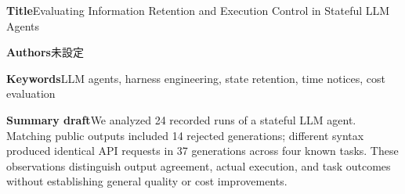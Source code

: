 \documentclass[uplatex,a4paper,twocolumn,10pt]{jsarticle}
\begin{document}
\clearpage
\onecolumn
\noindent\textbf{Title}\quad Evaluating Information Retention and Execution Control in Stateful LLM Agents

\noindent\textbf{Authors}\quad 未設定

\noindent\textbf{Keywords}\quad LLM agents, harness engineering, state retention, time notices, cost evaluation

\noindent\textbf{Summary draft}\quad We analyzed 24 recorded runs of a stateful LLM agent. Matching public outputs included 14 rejected generations; different syntax produced identical API requests in 37 generations across four known tasks. These observations distinguish output agreement, actual execution, and task outcomes without establishing general quality or cost improvements.
\end{document}

